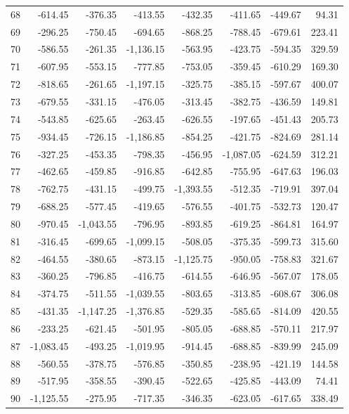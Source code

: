 \begin{longtable}{rrrrrrrr}
68 & -614.45 & -376.35 & -413.55 & -432.35 & -411.65 & -449.67 & 94.31  \\
69 & -296.25 & -750.45 & -694.65 & -868.25 & -788.45 & -679.61 & 223.41  \\
70 & -586.55 & -261.35 & -1,136.15 & -563.95 & -423.75 & -594.35 & 329.59  \\
71 & -607.95 & -553.15 & -777.85 & -753.05 & -359.45 & -610.29 & 169.30  \\
72 & -818.65 & -261.65 & -1,197.15 & -325.75 & -385.15 & -597.67 & 400.07  \\
73 & -679.55 & -331.15 & -476.05 & -313.45 & -382.75 & -436.59 & 149.81  \\
74 & -543.85 & -625.65 & -263.45 & -626.55 & -197.65 & -451.43 & 205.73  \\
75 & -934.45 & -726.15 & -1,186.85 & -854.25 & -421.75 & -824.69 & 281.14  \\
76 & -327.25 & -453.35 & -798.35 & -456.95 & -1,087.05 & -624.59 & 312.21  \\
77 & -462.65 & -459.85 & -916.85 & -642.85 & -755.95 & -647.63 & 196.03  \\
78 & -762.75 & -431.15 & -499.75 & -1,393.55 & -512.35 & -719.91 & 397.04  \\
79 & -688.25 & -577.45 & -419.65 & -576.55 & -401.75 & -532.73 & 120.47  \\
80 & -970.45 & -1,043.55 & -796.95 & -893.85 & -619.25 & -864.81 & 164.97  \\
81 & -316.45 & -699.65 & -1,099.15 & -508.05 & -375.35 & -599.73 & 315.60  \\
82 & -464.55 & -380.65 & -873.15 & -1,125.75 & -950.05 & -758.83 & 321.67  \\
83 & -360.25 & -796.85 & -416.75 & -614.55 & -646.95 & -567.07 & 178.05  \\
84 & -374.75 & -511.55 & -1,039.55 & -803.65 & -313.85 & -608.67 & 306.08  \\
85 & -431.35 & -1,147.25 & -1,376.85 & -529.35 & -585.65 & -814.09 & 420.55  \\
86 & -233.25 & -621.45 & -501.95 & -805.05 & -688.85 & -570.11 & 217.97  \\
87 & -1,083.45 & -493.25 & -1,019.95 & -914.45 & -688.85 & -839.99 & 245.09  \\
88 & -560.55 & -378.75 & -576.85 & -350.85 & -238.95 & -421.19 & 144.58  \\
89 & -517.95 & -358.55 & -390.45 & -522.65 & -425.85 & -443.09 & 74.41  \\
90 & -1,125.55 & -275.95 & -717.35 & -346.35 & -623.05 & -617.65 & 338.49  \\

\end{longtable}
